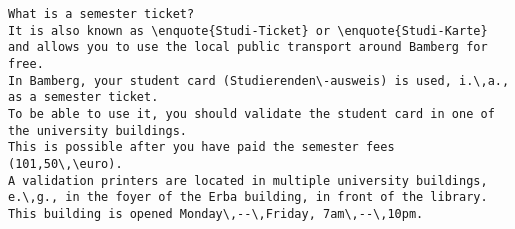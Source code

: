 \begin{verbatim}
What is a semester ticket?
It is also known as \enquote{Studi-Ticket} or \enquote{Studi-Karte} and allows you to use the local public transport around Bamberg for free.
In Bamberg, your student card (Studierenden\-ausweis) is used, i.\,a., as a semester ticket.
To be able to use it, you should validate the student card in one of the university buildings.
This is possible after you have paid the semester fees (101,50\,\euro).
A validation printers are located in multiple university buildings, e.\,g., in the foyer of the Erba building, in front of the library.
This building is opened Monday\,--\,Friday, 7am\,--\,10pm. 
\end{verbatim}

